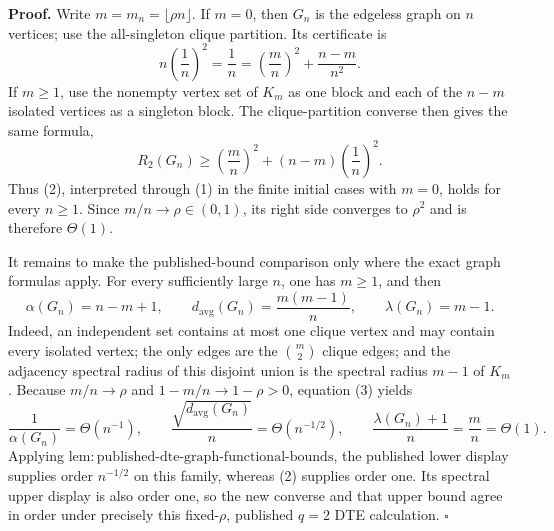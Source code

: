 \textbf{Proof.}
Write \(m=m_n=\lfloor\rho n\rfloor\). If \(m=0\), then \(G_n\) is the edgeless graph on \(n\) vertices; use the all-singleton clique partition. Its certificate is
\[
n\left(\frac1n\right)^2=\frac1n
=\left(\frac mn\right)^2+\frac{n-m}{n^2}.
\tag{1}
\]
If \(m\geq1\), use the nonempty vertex set of \(K_m\) as one block and each of the \(n-m\) isolated vertices as a singleton block. The clique-partition converse then gives the same formula,
\[
R_2(G_n)\geq
\left(\frac mn\right)^2+(n-m)\left(\frac1n\right)^2.
\tag{2}
\]
Thus (2), interpreted through (1) in the finite initial cases with \(m=0\), holds for every \(n\geq1\). Since \(m/n\to\rho\in(0,1)\), its right side converges to \(\rho^2\) and is therefore \(\Theta(1)\).

It remains to make the published-bound comparison only where the exact graph formulas apply. For every sufficiently large \(n\), one has \(m\geq1\), and then
\[
\alpha(G_n)=n-m+1,
\qquad
d_{\mathrm{avg}}(G_n)=\frac{m(m-1)}n,
\qquad
\lambda(G_n)=m-1.
\tag{3}
\]
Indeed, an independent set contains at most one clique vertex and may contain every isolated vertex; the only edges are the \(\binom m2\) clique edges; and the adjacency spectral radius of this disjoint union is the spectral radius \(m-1\) of \(K_m\). Because \(m/n\to\rho\) and \(1-m/n\to1-\rho>0\), equation (3) yields
\[
\frac1{\alpha(G_n)}=\Theta(n^{-1}),
\qquad
\frac{\sqrt{d_{\mathrm{avg}}(G_n)}}n=\Theta(n^{-1/2}),
\qquad
\frac{\lambda(G_n)+1}{n}=\frac mn=\Theta(1).
\tag{4}
\]
Applying \(\mathrm{lem{:}published\text{-}dte\text{-}graph\text{-}functional\text{-}bounds}\), the published lower display supplies order \(n^{-1/2}\) on this family, whereas (2) supplies order one. Its spectral upper display is also order one, so the new converse and that upper bound agree in order under precisely this fixed-\(\rho\), published \(q=2\) DTE calculation. \(\square\)